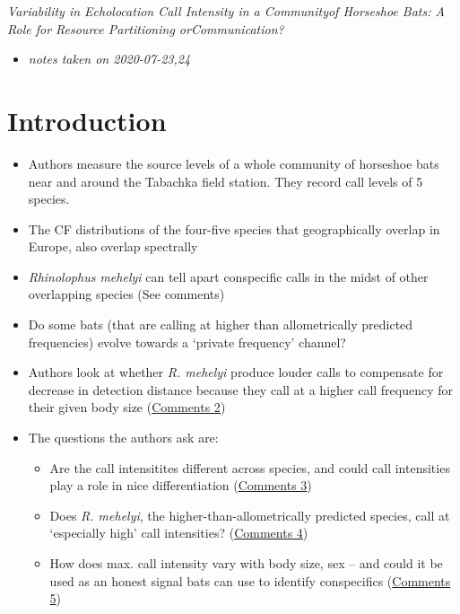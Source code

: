 \documentclass[
]{book}
\providecommand{\tightlist}{%
  \setlength{\itemsep}{0pt}\setlength{\parskip}{0pt}}
\begin{document}

\emph{Variability in Echolocation Call Intensity in a Communityof Horseshoe Bats: A Role for Resource Partitioning orCommunication?} \citep{schuchmannsiemers2010a}

\begin{itemize}
\tightlist
\item
  \emph{notes taken on 2020-07-23,24}
\end{itemize}

\hypertarget{introduction}{%
\section{Introduction}\label{introduction}}

\begin{itemize}
\item
  Authors measure the source levels of a whole community of horseshoe bats near and around the Tabachka field station. They record call levels of 5 species.
\item
  The CF distributions of the four-five species that geographically overlap in Europe, also overlap spectrally
\item
  \emph{Rhinolophus mehelyi} can tell apart conspecific calls in the midst of other overlapping species (See comments)
\item
  Do some bats (that are calling at higher than allometrically predicted frequencies) evolve towards a `private frequency' channel?
\item
  Authors look at whether \emph{R. mehelyi} produce louder calls to compensate for decrease in detection distance because they call at a higher call frequency for their given body size (\protect\hyperlink{com_shuchsiem}{Comments 2})
\item
  The questions the authors ask are:

  \begin{itemize}
  \tightlist
  \item
    Are the call intensitites different across species, and could call intensities play a role in nice differentiation (\protect\hyperlink{com_shuchsiem}{Comments 3})
  \item
    Does \emph{R. mehelyi}, the higher-than-allometrically predicted species, call at `especially high' call intensities? (\protect\hyperlink{com_shuchsiem}{Comments 4})
  \item
    How does max. call intensity vary with body size, sex -- and could it be used as an honest signal bats can use to identify conspecifics (\protect\hyperlink{com_shuchsiem}{Comments 5})
  \end{itemize}
\end{itemize}
\end{document}
